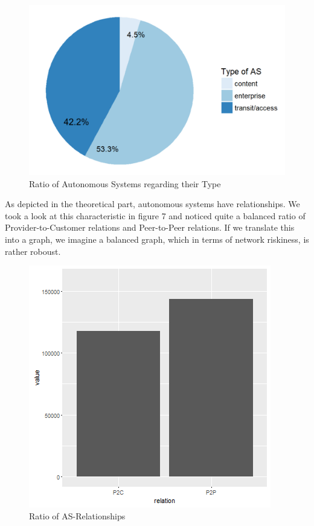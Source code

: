 \documentclass[conference, 11pt]{IEEEtran}
\begin{document}
\begin{figure}[htbp]
\centerline{\includegraphics[scale=0.4]{Graphics/typeofAS.PNG}}
\caption{Ratio of Autonomous Systems regarding their Type }
\label{fig}
\end{figure}

As depicted in the theoretical part, autonomous systems have relationships. We took a look at this characteristic in figure 7 and noticed quite a balanced ratio of Provider-to-Customer relations and Peer-to-Peer relations. If we translate this into a graph, we imagine a balanced graph, which in terms of network riskiness, is rather roboust. 

\begin{figure}[htbp]
\centerline{\includegraphics[scale=0.45]{Graphics/relationspeerandprovider.png}}
\caption{Ratio of AS-Relationships }
\label{fig}
\end{figure}
\end{document}

